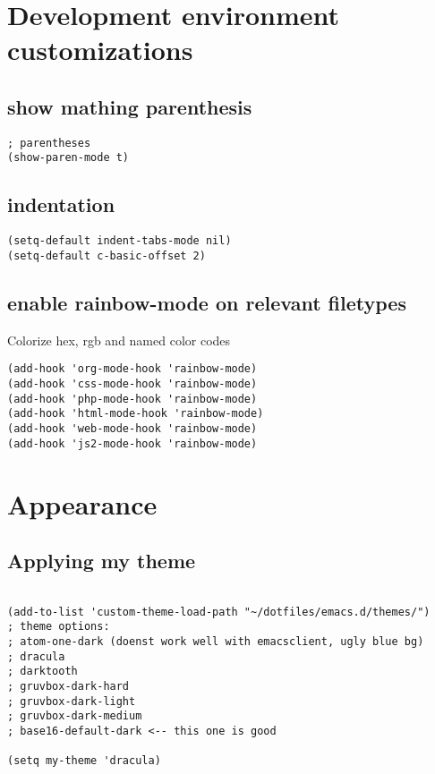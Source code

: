 \documentclass[11pt]{article}
\begin{document}
\section*{Development environment customizations}
\label{sec:orga3f1164}



\subsection*{show mathing parenthesis}
\label{sec:orga451ce6}
\begin{verbatim}
; parentheses
(show-paren-mode t)
\end{verbatim}



\subsection*{indentation}
\label{sec:org61b589e}
\begin{verbatim}
(setq-default indent-tabs-mode nil)
(setq-default c-basic-offset 2)
\end{verbatim}



\subsection*{enable rainbow-mode on relevant filetypes}
\label{sec:orgcbf0a14}

Colorize hex, rgb and named color codes

\begin{verbatim}
(add-hook 'org-mode-hook 'rainbow-mode)
(add-hook 'css-mode-hook 'rainbow-mode)
(add-hook 'php-mode-hook 'rainbow-mode)
(add-hook 'html-mode-hook 'rainbow-mode)
(add-hook 'web-mode-hook 'rainbow-mode)
(add-hook 'js2-mode-hook 'rainbow-mode)
\end{verbatim}



\section*{Appearance}
\label{sec:org74a3297}


\subsection*{Applying my theme}
\label{sec:orgd6940d3}

\begin{verbatim}

(add-to-list 'custom-theme-load-path "~/dotfiles/emacs.d/themes/")
; theme options:
; atom-one-dark (doenst work well with emacsclient, ugly blue bg)
; dracula
; darktooth
; gruvbox-dark-hard
; gruvbox-dark-light
; gruvbox-dark-medium
; base16-default-dark <-- this one is good

(setq my-theme 'dracula)

\end{verbatim}
\end{document}
